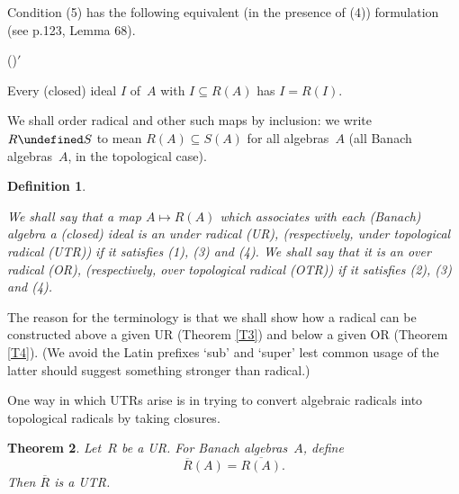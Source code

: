 \documentclass[11pt]{article}
\newcounter{arbdashenum}
\newenvironment{arbdashenumerate}{\begin{list}{{\rm(\arabic{arbdashenum})}$'$}%
{\usecounter{arbdashenum}}}{\end{list}}
\newcommand{\sseq}{\subseteq}
\newcommand{\implies}{\;\;\Rightarrow\;\;}
\let\leq\undefined  \let\geq\undefined
\let\le\leq   \let\ge\geq
\newcommand{\closure}[1]{\overline{#1}}
\newcommand{\idealin}{\lhd}
\newtheorem{thm}{Theorem}[section]
\newtheorem{definition}[thm]{Definition}
\newenvironment{Defn}{\begin{definition}\begin{rm}}{\end{rm}\end{definition}}
\newcommand{\detail}[1]{}
\newcommand{\Rbar}{\overline{R}}
\begin{document}
Condition (5) has the following equivalent (in the presence of (4)) formulation
(see \cite{Divinskybk} p.123, Lemma 68).
\begin{arbdashenumerate}
\addtocounter{arbdashenum}{4}
\item Every (closed) ideal $I$ of~$A$ with $I \sseq R(A)$ has $I = R(I)$.
\end{arbdashenumerate}
\detail{That (5)$\implies$(5)$'$ is obvious.  Conversely, given (5)$'$, then the argument
\begin{eqnarray*}
I\cap R(A) & = & R(I \cap R(A)), \qquad\mbox{by (5)$'$ applied to }I \cap R(A) \sseq R(A)\\
&\sseq&R(I) \cap I \cap R(A), \qquad\mbox{by (4) applied to }I \cap R(A) \idealin I
\end{eqnarray*}
proves (5).}

We shall order radical and other such maps by inclusion: we write $R \le S$ to
mean $R(A) \sseq S(A)$ for all algebras~$A$ (all Banach algebras~$A$,
in the topological case).

\begin{Defn}\label{D2}
We shall say that a map $A \mapsto R(A)$ which associates with each (Banach)
algebra a (closed) ideal is an {\em under radical (UR)}, (respectively,
{\em under topological radical (UTR)}) if it satisfies
(1), (3) and (4).   We shall say that it is an {\em over radical (OR)}, (respectively,
{\em over topological radical (OTR)}) if it satisfies
(2), (3) and (4).
\end{Defn}

The reason for the terminology is that we shall show how a radical can
be constructed above a given UR (Theorem \ref{T3}) and
below a given OR (Theorem \ref{T4}).    (We avoid the
Latin prefixes `sub' and `super' lest common usage of the latter should
suggest something stronger than radical.)

One way in which UTRs arise is in trying to convert algebraic
radicals into topological radicals by taking closures.

\begin{thm}\label{T2}
Let~$R$ be a UR.   For Banach algebras~$A$, define
$$\Rbar(A) = \closure{R(A)}.$$
Then $\Rbar$ is a UTR.
\end{thm}
\end{document}

